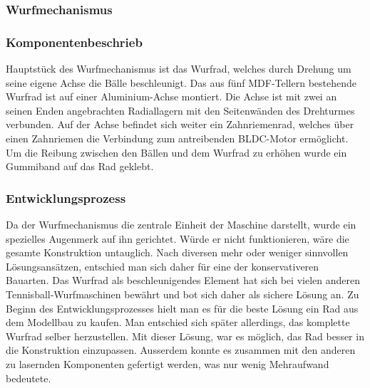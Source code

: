 \subsubsection{Wurfmechanismus}
\subsubsection*{Komponentenbeschrieb}

Hauptstück des Wurfmechanismus ist das Wurfrad, welches durch Drehung um seine eigene Achse die Bälle beschleunigt.
Das aus fünf MDF-Tellern bestehende Wurfrad ist auf einer  Aluminium-Achse montiert. Die Achse ist mit zwei an seinen Enden angebrachten Radiallagern mit den Seitenwänden des Drehturmes verbunden. Auf der Achse befindet sich weiter ein Zahnriemenrad, welches über einen Zahnriemen die Verbindung zum antreibenden BLDC-Motor ermöglicht.
Um die Reibung zwischen den Bällen und dem Wurfrad zu erhöhen wurde ein Gummiband auf das Rad geklebt.


\subsubsection*{Entwicklungsprozess}

Da der Wurfmechanismus die zentrale Einheit der Maschine darstellt, wurde ein spezielles Augenmerk auf ihn gerichtet. Würde er nicht funktionieren, wäre die gesamte Konstruktion untauglich. Nach diversen mehr oder weniger sinnvollen Lösungsansätzen, entschied man sich daher für eine der konservativeren Bauarten.
Das Wurfrad als beschleunigendes Element hat sich bei vielen anderen Tennisball-Wurfmaschinen bewährt und bot sich daher als sichere Lösung an.
Zu Beginn des Entwicklungsprozesses hielt man es für die beste Lösung ein Rad aus dem Modellbau zu kaufen. Man entschied sich später allerdings, das komplette Wurfrad selber herzustellen. Mit dieser Lösung, war es möglich, das Rad besser in die Konstruktion einzupassen. Ausserdem konnte es zusammen mit den anderen zu lasernden Komponenten gefertigt werden, was nur wenig Mehraufwand bedeutete.
